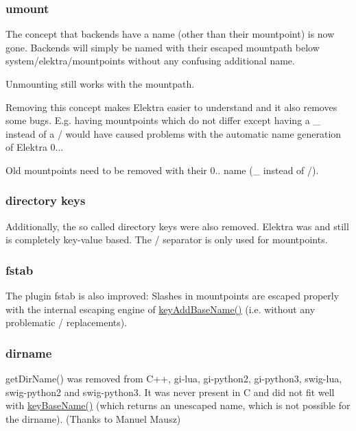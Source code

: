 \subsubsection*{umount}

The concept that backends have a name (other than their mountpoint) is now gone. Backends will simply be named with their escaped mountpath below system/elektra/mountpoints without any confusing additional name.

Unmounting still works with the mountpath.

Removing this concept makes Elektra easier to understand and it also removes some bugs. E.\+g. having mountpoints which do not differ except having a {\ttfamily \+\_\+} instead of a {\ttfamily /} would have caused problems with the automatic name generation of Elektra 0...

Old mountpoints need to be removed with their 0.. name ({\ttfamily \+\_\+} instead of {\ttfamily /}).

\subsubsection*{directory keys}

Additionally, the so called directory keys were also removed. Elektra was and still is completely key-\/value based. The {\ttfamily /} separator is only used for mountpoints.

\subsubsection*{fstab}

The plugin fstab is also improved\+: Slashes in mountpoints are escaped properly with the internal escaping engine of \hyperlink{group__keyname_gaa942091fc4bd5c2699e49ddc50829524}{key\+Add\+Base\+Name()} (i.\+e. without any problematic {\ttfamily /} replacements).

\subsubsection*{dirname}

get\+Dir\+Name() was removed from C++, gi-\/lua, gi-\/python2, gi-\/python3, swig-\/lua, swig-\/python2 and swig-\/python3. It was never present in C and did not fit well with \hyperlink{group__keyname_gaaff35e7ca8af5560c47e662ceb9465f5}{key\+Base\+Name()} (which returns an unescaped name, which is not possible for the dirname). (Thanks to Manuel Mausz)

